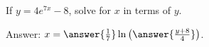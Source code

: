 \documentclass{ximera}
\author{Ivo Terek}
\begin{document}
\begin{exercise}

  If $y = 4e^{7x}-8$, solve for $x$ in terms of $y$.

  Answer: $x = \answer{\frac{1}{7}} \ln \left(\answer{{\frac{y+8}{4}}}\right)$.

\end{exercise}
\end{document}
